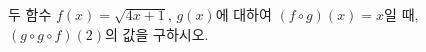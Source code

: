 \hspace*{2mm}\begin{minipage}[t]{\dimexpr\linewidth-2mm\relax}\vspace{0pt}
두 함수 $f(x)=\sqrt{4x+1}$, $g(x)$에 대하여 $(f\circ g)(x)=x$일 때, $(g\circ g\circ f)(2)$의 값을 구하시오.\end{minipage}

